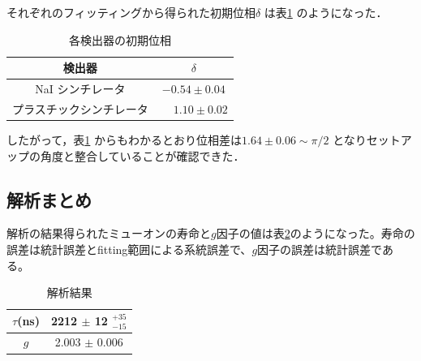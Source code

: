 それぞれのフィッティングから得られた初期位相$\delta$ は表\ref{tab:InitPhases} のようになった．

\begin{table}[h]
	\centering
	\caption{各検出器の初期位相}
	\begin{tabular}{cc}\toprule
	検出器 & $\delta$ \\ \midrule
	NaI シンチレータ & $-0.54 \pm 0.04$ \\
	プラスチックシンチレータ & $\phantom{-}1.10 \pm 0.02$ \\ \bottomrule
	\end{tabular}\label{tab:InitPhases}
\end{table}%
したがって，表\ref{tab:InitPhases} からもわかるとおり位相差は$1.64 \pm 0.06 \sim \pi / 2$ となりセットアップの角度と整合していることが確認できた．

\subsection{解析まとめ}
解析の結果得られたミューオンの寿命と$g$因子の値は表\ref{matome_ike}のようになった。寿命の誤差は統計誤差とfitting範囲による系統誤差で、$g$因子の誤差は統計誤差である。

\begin{table}[H]
\caption{解析結果}
\label{matome_ike}
\begin{center}
\begin{tabular}{cc}\toprule
$\tau$(ns) 	& 2212 $\pm$ 12 $^{ + 35}_{ - 15}$  \\ \midrule
$g$		& 2.003 $\pm$ 0.006 \\ \bottomrule
\end{tabular}
\end{center}
\end{table}%

%
